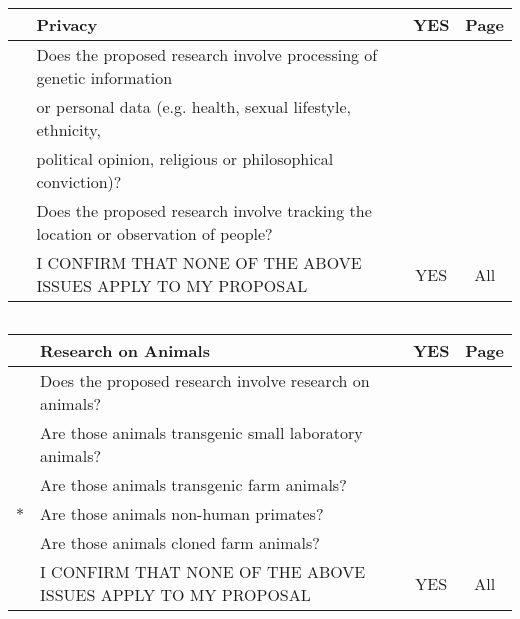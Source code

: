 \documentclass[12pt]{article}
\begin{document}
{$\;$\\ $\;$\\
\begin{tabular}{|c|l|c|c|}
\hline
  $\;$    &    Privacy &  YES&       Page                                                                    \\
\hline
      &    Does the proposed research involve processing of genetic information        &  &              \\
\hline
&or personal data (e.g. health, sexual lifestyle, ethnicity,                           &  &              \\
&political opinion, religious or philosophical conviction)?                           &  &               \\
\hline
      &    Does the proposed research involve tracking the location or observation of people?    &  &    \\
\hline
      &    I CONFIRM THAT NONE OF THE ABOVE ISSUES APPLY TO MY PROPOSAL   &   YES &      All             \\
\hline
\end{tabular}

$\;$\\ $\;$\\
\begin{tabular}{|c|l|c|c|}
\hline
       &   Research on Animals     &    YES    &   Page                                                   \\
\hline
       &   Does the proposed research involve research on animals?        &  &                            \\
\hline
       &   Are those animals transgenic small laboratory animals?       &  &                              \\
\hline
       &   Are those animals transgenic farm animals?              &  &                                   \\
\hline
$\ast$ &        Are those animals non-human primates?            &  &                                     \\
\hline
       &   Are those animals cloned farm animals?                &  &                                     \\
\hline
      &    I CONFIRM THAT NONE OF THE ABOVE ISSUES APPLY TO MY PROPOSAL  &    YES  &     All              \\
\hline
\end{tabular}

}
\end{document}
